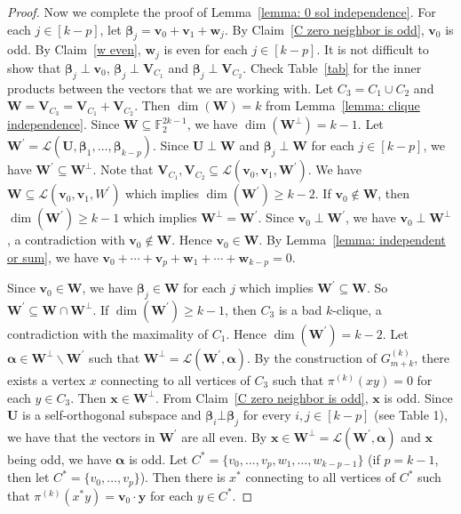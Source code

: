 \documentclass[10pt,a4paper]{amsart}
\begin{document}
\begin{proof}
Now we complete the proof of Lemma~\ref{lemma: 0 sol independence}. For each $j\in[k-p]$, let $\boldsymbol{\beta}_j=\textbf{v}_0+\textbf{v}_1+\textbf{w}_j$. By Claim~\ref{C zero neighbor is odd},  $\textbf{v}_{0}$ is odd. By Claim~\ref{w even}, $\textbf{w}_j$ is even for each $j\in[k-p]$.
 It is not difficult to show that  $\boldsymbol{\beta}_j\perp \textbf{v}_{0}$, $\boldsymbol{\beta}_j\perp \textbf{V}_{C_1}$ and $\boldsymbol{\beta}_j\perp \textbf{V}_{C_2}$. Check Table~\ref{tab} for the inner products between the vectors that we are working with.
Let $C_3=C_1\cup C_2$ and $\mathbf{W}=\textbf{V}_{C_3}=\textbf{V}_{C_1}+\textbf{V}_{C_2}$. Then  $\dim(\mathbf{W})=k$ from Lemma~\ref{lemma: clique independence}. Since $\mathbf{W} \subseteq  \mathbb{F}_2^{2k-1}$, we have  $\dim(\mathbf{W} ^{\perp})=k-1$. Let $\mathbf{W} ^{\prime}=\mathcal{L}(\textbf{U},\boldsymbol{\beta}_1,\dots,\boldsymbol{\beta}_{k-p})$. Since $\textbf{U}\perp \mathbf{W}$ and $\boldsymbol{\beta}_j\perp \mathbf{W}$ for each $j\in[k-p]$, we have  $\mathbf{W}^{\prime}\subseteq \mathbf{W}^{\perp}$. Note that $\textbf{V}_{C_1},\textbf{V}_{C_2}\subseteq \mathcal{L}(\textbf{v}_0,\textbf{v}_1,\mathbf{W}^{\prime})$. We have $\mathbf{W} \subseteq \mathcal{L}(\textbf{v}_0,\textbf{v}_1,W^{\prime})$ which implies  $\dim(\mathbf{W}^{\prime})\ge k-2$. If $\textbf{v}_0\notin \mathbf{W}$, then  $\dim(\mathbf{W}^{\prime})\ge k-1$ which implies $\mathbf{W}^{\perp}=\mathbf{W}^{\prime}$. Since $\textbf{v}_0\perp \mathbf{W}^{\prime}$, we have $\textbf{v}_0\perp \mathbf{W}^{\perp}$, a contradiction with $\textbf{v}_0\notin \mathbf{W}$. Hence $\textbf{v}_0\in \mathbf{W}$.
By Lemma~\ref{lemma: independent or sum}, we have $ \textbf{v}_0+\cdots+\textbf{v}_p+\textbf{w}_1+\cdots+\textbf{w}_{k-p}=0 $.

Since $\textbf{v}_0\in \mathbf{W}$, we have $\boldsymbol{\beta}_j\in \mathbf{W}$ for each $j$ which implies $\mathbf{W}^{\prime}\subseteq \mathbf{W}$. So  $\mathbf{W}^{\prime}\subseteq \mathbf{W}\cap \mathbf{W}^{\perp}$.
If  $\dim(\mathbf{W}^{\prime})\ge k-1$, then $C_3$ is a bad $k$-clique,  a contradiction with the maximality of $C_1$. Hence $\dim(\mathbf{W}^{\prime})=k-2$. Let $\boldsymbol{\alpha} \in \mathbf{W}^{\perp}\backslash \mathbf{W}^{\prime}$ such that $\mathbf{W}^{\perp}=\mathcal{L}(\mathbf{W}^{\prime},\boldsymbol{\alpha})$. By the construction of $G^{(k)}_{m+k}$, there exists  a vertex $x$ connecting to all vertices of $C_3$ such that $\pi^{(k)}(xy) = 0$ for each $y \in C_3$. Then $\textbf{x}\in \mathbf{W}^{\perp}$.
From Claim~\ref{C zero neighbor is odd}, $\textbf{x}$ is odd. 
Since $\textbf{U}$ is a self-orthogonal subspace and $\boldsymbol{\beta}_i\bot \boldsymbol{\beta}_j$ for every $i,j\in [k-p]$ (see Table 1), we have that
the vectors in $\mathbf{W}^{\prime}$ are all even.  By $\textbf{x}\in \mathbf{W}^{\perp}=\mathcal{L}(\mathbf{W}^{\prime},\boldsymbol{\alpha})$ and $\textbf{x}$ being odd, we have $\boldsymbol{\alpha}$ is odd. 
Let $C^*=\{v_0,\ldots,v_p,w_1,\ldots,w_{k-p-1}\}$ (if $p=k-1$, then let $C^*=\{v_0,\ldots,v_p\}$). Then there is 
 $x^*$ connecting to all vertices of $C^*$ such that $\pi^{(k)}(x^* y) =\textbf{v}_0\cdot \textbf{y}$ for each $y\in C^*$. 
 

\end{proof}
\end{document}
